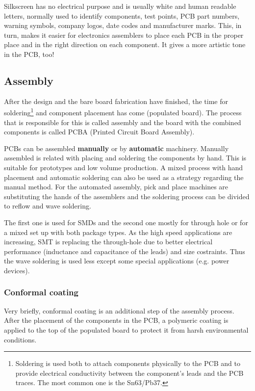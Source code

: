 \documentclass[final]{cubedoc}
\begin{document}
	Silkscreen has no electrical purpose and is usually white and human readable letters, normally used to identify components, test points, PCB part numbers, warning symbols, company logos, date codes and manufacturer marks. This, in turn, makes it easier for electronics assemblers to place each PCB in the proper place and in the right direction on each component. It gives a more artistic tone in the PCB, too!
	
	
	\subsection{Assembly}
	
	After the design and the bare board fabrication have finished, the time for soldering\footnote{Soldering is used both to attach components physically to the PCB and to provide electrical conductivity between the component’s leads and the PCB traces. The most common one is the Sn63/Pb37.} and component placement has come (populated board). The process that is responsible for this is called assembly and the board with the combined components is called PCBA (Printed Circuit Board Assembly).
	
	PCBs can be assembled \textbf{manually} or by \textbf{automatic} machinery. Manually assembled is related with placing and soldering the components by hand. This is suitable for prototypes and low volume production. A mixed process with hand placement and automatic soldering can also be used as a strategy regarding the manual method. For the automated assembly, pick and place machines are substituting the hands of the assemblers and the soldering process can be divided to reflow and wave soldering. 
	
	The first one is used for SMDs and the second one mostly for through hole or for a mixed set up with both package types. 
	As the high speed applications are increasing, SMT is replacing the through-hole due to better electrical performance (inductance and capacitance of the leads) and size costraints. Thus the wave soldering is used less except some special applications (e.g. power devices).
	
	\subsubsection{Conformal coating}
	
	Very briefly, conformal coating is an additional step of the assembly process. After the placement of the components in the PCB, a polymeric coating is applied to the top of the populated board to protect it from harsh environmental conditions.
	
\end{document}
